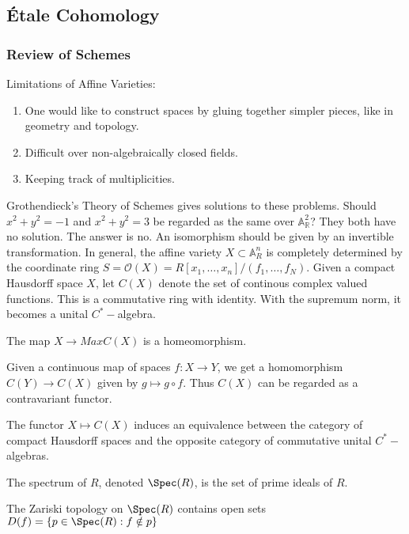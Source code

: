 \documentclass[crop=false,class=book]{standalone}
\begin{document}
\subsection{\'{E}tale Cohomology}
\subsubsection{Review of Schemes}
\begin{remark}
Limitations of Affine Varieties:
\begin{enumerate}
    \item One would like to construct spaces by gluing together simpler pieces, like in geometry and topology.
    \item Difficult over non-algebraically closed fields.
    \item Keeping track of multiplicities.
\end{enumerate}
\end{remark}
Grothendieck's Theory of Schemes gives solutions to these problems. Should $x^{2}+y^{2}=-1$ and $x^{2}+y^{2}=3$ be regarded as the same over $\mathbb{A}_{\mathbb{R}}^{2}$? They both have no solution. The answer is no. An isomorphism should be given by an invertible transformation. In general, the affine variety $X\subset \mathbb{A}_{R}^n$ is completely determined by the coordinate ring $S = \mathcal{O}(X) = R[x_1,\hdots, x_n]/(f_1,\hdots, f_N)$. Given a compact Hausdorff space $X$, let $C(X)$ denote the set of continous complex valued functions. This is a commutative ring with identity. With the supremum norm, it becomes a unital $C^{*}-$algebra.
\begin{theorem}
The map $X\rightarrow MaxC(X)$ is a homeomorphism.
\end{theorem}
Given a continuous map of spaces $f:X\rightarrow Y$, we get a homomorphism $C(Y)\rightarrow C(X)$ given by $g\mapsto g\circ f$. Thus $C(X)$ can be regarded as a contravariant functor. 
\begin{theorem}[Gelfand]
The functor $X\mapsto C(X)$ induces an equivalence between the category of compact Hausdorff spaces and the opposite category of commutative unital $C^{*}-$algebras.
\end{theorem}
\begin{definition}
The spectrum of $R$, denoted $\Spec(R)$, is the set of prime ideals of $R$.
\end{definition}
\begin{theorem}
The Zariski topology on $\Spec(R)$ contains open sets $D(f)=\{p\in\Spec(R):f\notin p\}$
\end{theorem}
\end{document}
